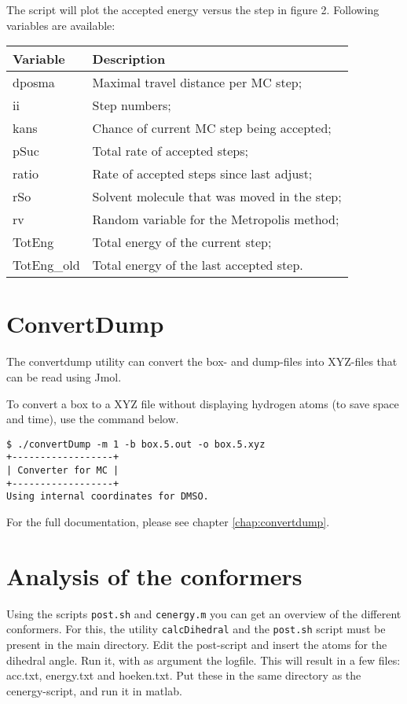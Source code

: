 The script will plot the accepted energy versus the step in figure 2. Following 
variables are available:

\begin{tabular}{ll}
	Variable & Description \\ \hline
	dposma & Maximal travel distance per MC step; \\
	ii & Step numbers; \\
	kans & Chance of current MC step being accepted; \\
	pSuc & Total rate of accepted steps; \\
	ratio & Rate of accepted steps since last adjust; \\
	rSo & Solvent molecule that was moved in the step; \\
	rv & Random variable for the Metropolis method; \\
	TotEng & Total energy of the current step; \\
	TotEng\_old & Total energy of the last accepted step. \\
\end{tabular}

\section{ConvertDump}
The convertdump utility can convert the box- and dump-files into XYZ-files that 
can be read using Jmol.

To convert a box to a XYZ file without displaying hydrogen atoms (to save space 
and time), use the command below.

\begin{lstlisting}[caption=Convert a box to a XYZ file]
$ ./convertDump -m 1 -b box.5.out -o box.5.xyz
+------------------+
| Converter for MC |
+------------------+
Using internal coordinates for DMSO.
\end{lstlisting}

For the full documentation, please see chapter \ref{chap:convertdump}.

\section{Analysis of the conformers}
Using the scripts \verb|post.sh| and \verb|cenergy.m| you can get an overview 
of the different conformers. For this, the utility \verb|calcDihedral| and the 
\verb|post.sh| script must be present in the main directory. Edit the 
post-script and insert the atoms for the dihedral angle. Run it, with as 
argument the logfile. This will result in a few files: acc.txt, energy.txt and 
hoeken.txt. Put these in the same directory as the cenergy-script, and run it 
in matlab.

